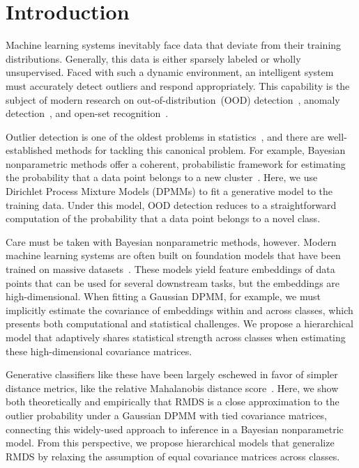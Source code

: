 \section{Introduction}
\label{sec:intro}
Machine learning systems inevitably face data that deviate from their training distributions.
Generally, this data is either sparsely labeled or wholly unsupervised.
Faced with such a dynamic environment, an intelligent system must accurately detect outliers and respond appropriately.
This capability is the subject of modern research on out-of-distribution~(OOD) detection~\citep{HendrycksD17}, anomaly detection~\cite{chandola2009anomaly}, and open-set recognition~\citep{scheirer12openset}.

Outlier detection is one of the oldest problems in statistics~\citep{anscombe1960rejection}, and there are well-established methods for tackling this canonical problem.
For example, Bayesian nonparametric methods offer a coherent, probabilistic framework for estimating the probability that a data point belongs to a new cluster~\citep{ferguson1973bayesian,antoniak74dpmm,lo1984class,Sethuraman94, maceachern1994estimating, neal00}.
Here, we use Dirichlet Process Mixture Models (DPMMs) to fit a generative model to the training data.
Under this model, OOD detection reduces to a straightforward computation of the probability that a data point belongs to a novel class.

Care must be taken with Bayesian nonparametric methods, however.
Modern machine learning systems are often built on foundation models that have been trained on massive datasets~\citep{dosovitskiy20vit,caron21dino,oquab23dinov2,darcet23needreg,chen20simclr,chen20simclrv2}.
These models yield feature embeddings of data points that can be used for several downstream tasks, but the embeddings are high-dimensional.
When fitting a Gaussian DPMM, for example, we must implicitly estimate the covariance of embeddings within and across classes, which presents both computational and statistical challenges.
We propose a hierarchical model that adaptively shares statistical strength across classes when estimating these high-dimensional covariance matrices.

Generative classifiers like these have been largely eschewed in favor of simpler distance metrics, like the relative Mahalanobis distance score~\citep[RMDS;][]{ren21rmds}.
Here, we show both theoretically and empirically that RMDS is a close approximation to the outlier probability under a Gaussian DPMM with tied covariance matrices, connecting this widely-used approach to inference in a Bayesian nonparametric model.
From this perspective, we propose hierarchical models that generalize RMDS by relaxing the assumption of equal covariance matrices across classes.

